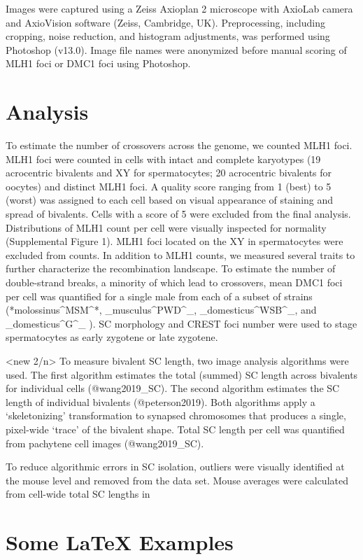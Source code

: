 \documentclass[9pt,lineno]{elife}
\begin{document}
Images were captured using a Zeiss Axioplan 2 microscope with AxioLab camera and AxioVision software (Zeiss, Cambridge, UK). Preprocessing, including cropping, noise reduction, and histogram adjustments, was performed using Photoshop (v13.0). Image file names were anonymized before manual scoring of MLH1 foci or DMC1 foci using Photoshop.

\section{Analysis}

To estimate the number of crossovers across the genome, we counted MLH1 foci. MLH1 foci were counted in cells with intact and complete karyotypes (19 acrocentric bivalents and XY for spermatocytes; 20 acrocentric bivalents for oocytes) and distinct MLH1 foci. A quality score ranging from 1 (best) to 5 (worst) was assigned to each cell based on visual appearance of staining and spread of bivalents. Cells with a score of 5 were excluded from the final analysis. Distributions of MLH1 count per cell were visually inspected for normality (Supplemental Figure 1). MLH1 foci located on the XY in spermatocytes were excluded from counts. In addition to MLH1 counts, we measured several traits to further characterize the recombination landscape. To estimate the number of double-strand breaks, a minority of which lead to crossovers, mean DMC1 foci per cell was quantified for a single male from each of a subset of strains (*molossinus^MSM^*, _musculus^PWD^_,  _domesticus^WSB^_, and _domesticus^G^_ ). SC morphology and CREST foci number were used to stage spermatocytes as early zygotene or late zygotene.

<new 2/n>
To measure bivalent SC length, two image analysis algorithms were used. The first algorithm estimates the total (summed) SC length across bivalents for individual cells (@wang2019_SC). The second algorithm estimates the SC length of individual bivalents (@peterson2019). Both algorithms apply a ‘skeletonizing’ transformation to synapsed chromosomes that produces a single, pixel-wide ‘trace’ of the bivalent shape. Total SC length per cell was quantified from pachytene cell images (@wang2019_SC). 

To reduce algorithmic errors in SC isolation, outliers were visually identified at the mouse level and removed from the data set. Mouse averages were calculated from cell-wide total SC lengths in 



\section{Some \LaTeX{} Examples}
\label{sec:examples}
\end{document}
